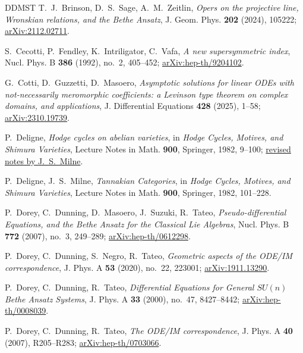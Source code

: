 \documentclass[11pt,leqno]{amsart}
\numberwithin{equation}{section}
\theoremstyle{plain}
\theoremstyle{definition}
\theoremstyle{plain}
\theoremstyle{definition}
\theoremstyle{remark}
\begin{document}
\begin{thebibliography}{DDMST}
T.~J.~Brinson, D.~S.~Sage, A.~M.~Zeitlin,
\emph{Opers on the projective line, Wronskian relations, and the Bethe Ansatz},
J. Geom. Phys. \textbf{202} (2024), 105222; \href{https://arxiv.org/abs/2112.02711}{arXiv:2112.02711}.

S.~Cecotti, P.~Fendley, K.~Intriligator, C.~Vafa,
\emph{A new supersymmetric index},
Nucl. Phys. B \textbf{386} (1992), no.~2, 405--452; \href{https://arxiv.org/abs/hep-th/9204102}{arXiv:hep-th/9204102}.

G.~Cotti, D.~Guzzetti, D.~Masoero,
\emph{Asymptotic solutions for linear ODEs with not-necessarily meromorphic coefficients: a Levinson type theorem on complex domains, and applications},
J. Differential Equations \textbf{428} (2025), 1--58; \href{https://arxiv.org/abs/2310.19739}{arXiv:2310.19739}.

P.~Deligne,
\emph{Hodge cycles on abelian varieties},
in \emph{Hodge Cycles, Motives, and Shimura Varieties}, Lecture Notes in Math. \textbf{900}, Springer, 1982, 9--100; \href{https://www.jmilne.org/math/Documents/Deligne82_2011.pdf}{revised notes by J.~S.~Milne}.

P.~Deligne, J.~S.~Milne,
\emph{Tannakian Categories},
in \emph{Hodge Cycles, Motives, and Shimura Varieties}, Lecture Notes in Math. \textbf{900}, Springer, 1982, 101--228.

P.~Dorey, C.~Dunning, D.~Masoero, J.~Suzuki, R.~Tateo,
\emph{Pseudo-differential Equations, and the Bethe Ansatz for the Classical Lie Algebras},
Nucl. Phys. B \textbf{772} (2007), no.~3, 249--289; \href{https://arxiv.org/abs/hep-th/0612298}{arXiv:hep-th/0612298}.

P.~Dorey, C.~Dunning, S.~Negro, R.~Tateo,
\emph{Geometric aspects of the ODE/IM correspondence},
J. Phys. A \textbf{53} (2020), no.~22, 223001; \href{https://arxiv.org/abs/1911.13290}{arXiv:1911.13290}.

P.~Dorey, C.~Dunning, R.~Tateo,
\emph{Differential Equations for General $SU(n)$ Bethe Ansatz Systems},
J. Phys. A \textbf{33} (2000), no.~47, 8427--8442; \href{https://arxiv.org/abs/hep-th/0008039}{arXiv:hep-th/0008039}.

P.~Dorey, C.~Dunning, R.~Tateo,
\emph{The ODE/IM correspondence},
J. Phys. A \textbf{40} (2007), R205--R283; \href{https://arxiv.org/abs/hep-th/0703066}{arXiv:hep-th/0703066}.


\end{thebibliography}
\end{document}

